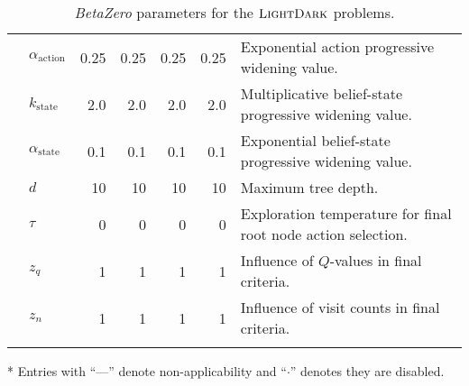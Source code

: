 \begin{table*}[pt!]
\begin{adjustbox}{max width=0.92\textwidth}
\begin{threeparttable}
\begin{footnotesize}
\begin{tabular}{@{}clrrrrm{9cm}@{}}
              & $\alpha_\text{action}$ & \num{0.25} & \num{0.25} & \num{0.25} & \num{0.25} & Exponential action progressive widening value.\\
              & $k_\text{state}$ & \num{2.0} & \num{2.0} & \num{2.0} & \num{2.0} & Multiplicative belief-state progressive widening value.\\
              & $\alpha_\text{state}$ & \num{0.1} & \num{0.1} & \num{0.1} & \num{0.1} & Exponential belief-state progressive widening value.\\
              & $d$ & \num{10} & \num{10} & \num{10} & \num{10} & Maximum tree depth. \\
              & $\tau$ & \num{0} & \num{0} & \num{0} & \num{0} & Exploration temperature for final root node action selection. \\
              & $z_q$ & \num{1} & \num{1} & \num{1} & \num{1} & Influence of $Q$-values in final criteria. \\
              & $z_n$ & \num{1} & \num{1} & \num{1} & \num{1} & Influence of visit counts in final criteria. \\
            \arrayrulecolor{black} %
            \bottomrule
        \end{tabular}
        \begin{tablenotes}
            \item[*] {Entries with ``---'' denote non-applicability and ``$\cdot$'' denotes they are disabled.}
        \end{tablenotes}
        \end{footnotesize}
    \end{threeparttable}
    \end{adjustbox}
    \caption{\textit{BetaZero} parameters for the $\textsc{LightDark}$ problems.}\label{tab:ld_params}
\end{table*}


